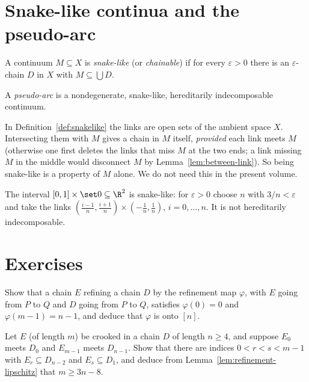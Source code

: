 
\section{Snake-like continua and the pseudo-arc}

\begin{definition}\label{def:snakelike}
A continuum $M\subseteq X$ is \emph{snake-like} (or \emph{chainable}) if for every
$\varepsilon>0$ there is an $\varepsilon$-chain $D$ in $X$ with $M\subseteq\bigcup D$.
\end{definition}

\begin{definition}\label{def:pseudoarc}
A \emph{pseudo-arc} is a nondegenerate, snake-like, hereditarily indecomposable continuum.
\end{definition}


\begin{remark}
In Definition~\ref{def:snakelike} the links are open sets of the ambient space $X$. Intersecting
them with $M$ gives a chain in $M$ itself, \emph{provided} each link meets $M$ (otherwise one
first deletes the links that miss $M$ at the two ends; a link missing $M$ in the middle would
disconnect $M$ by Lemma~\ref{lem:between-link}). So being snake-like is a property of $M$
alone. We do not need this in the present volume.
\end{remark}

\begin{example}
The interval $[0,1]\times\set0\subseteq\R^2$ is snake-like: for $\varepsilon>0$ choose $n$ with
$3/n<\varepsilon$ and take the links $(\frac{i-1}{n},\frac{i+1}{n})\times(-\frac1n,\frac1n)$,
$i=0,\dots,n$. It is not hereditarily indecomposable.
\end{example}

\section*{Exercises}

\begin{exercise}
Show that a chain $E$ refining a chain $D$ by the refinement map $\varphi$, with $E$ going from
$P$ to $Q$ and $D$ going from $P$ to $Q$, satisfies $\varphi(0)=0$ and $\varphi(m-1)=n-1$, and
deduce that $\varphi$ is onto $[n]$.
\end{exercise}

\begin{exercise}
Let $E$ (of length $m$) be crooked in a chain $D$ of length $n\ge4$, and suppose $E_0$ meets
$D_0$ and $E_{m-1}$ meets $D_{n-1}$. Show that there are indices $0<r<s<m-1$ with
$E_r\subseteq D_{n-2}$ and $E_s\subseteq D_1$, and deduce from
Lemma~\ref{lem:refinement-lipschitz} that $m\ge3n-8$.
\end{exercise}
